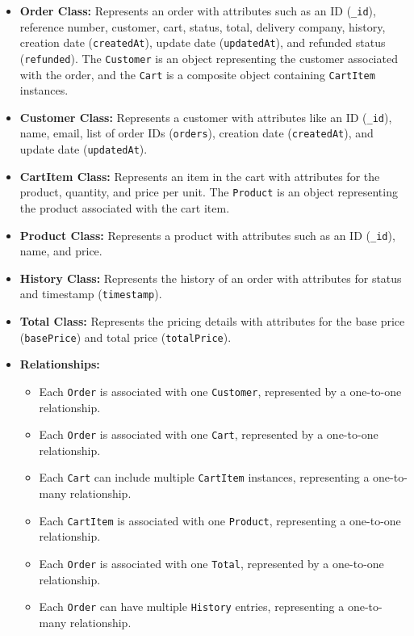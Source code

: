 \begin{itemize}
    \item \textbf{Order Class:} Represents an order with attributes such as an ID (\texttt{\_id}), reference number, customer, cart, status, total, delivery company, history, creation date (\texttt{createdAt}), update date (\texttt{updatedAt}), and refunded status (\texttt{refunded}). The \texttt{Customer} is an object representing the customer associated with the order, and the \texttt{Cart} is a composite object containing \texttt{CartItem} instances.

    \item \textbf{Customer Class:} Represents a customer with attributes like an ID (\texttt{\_id}), name, email, list of order IDs (\texttt{orders}), creation date (\texttt{createdAt}), and update date (\texttt{updatedAt}).

    \item \textbf{CartItem Class:} Represents an item in the cart with attributes for the product, quantity, and price per unit. The \texttt{Product} is an object representing the product associated with the cart item.

    \item \textbf{Product Class:} Represents a product with attributes such as an ID (\texttt{\_id}), name, and price.

    \item \textbf{History Class:} Represents the history of an order with attributes for status and timestamp (\texttt{timestamp}).

    \item \textbf{Total Class:} Represents the pricing details with attributes for the base price (\texttt{basePrice}) and total price (\texttt{totalPrice}).

    \item \textbf{Relationships:}
    \begin{itemize}
        \item Each \texttt{Order} is associated with one \texttt{Customer}, represented by a one-to-one relationship.
        \item Each \texttt{Order} is associated with one \texttt{Cart}, represented by a one-to-one relationship.
        \item Each \texttt{Cart} can include multiple \texttt{CartItem} instances, representing a one-to-many relationship.
        \item Each \texttt{CartItem} is associated with one \texttt{Product}, representing a one-to-one relationship.
        \item Each \texttt{Order} is associated with one \texttt{Total}, represented by a one-to-one relationship.
        \item Each \texttt{Order} can have multiple \texttt{History} entries, representing a one-to-many relationship.
    \end{itemize}
\end{itemize}

